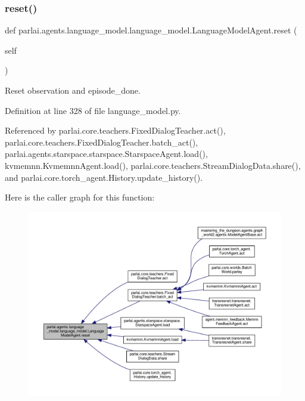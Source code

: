\subsubsection{\texorpdfstring{reset()}{reset()}}
{\footnotesize\ttfamily def parlai.\+agents.\+language\+\_\+model.\+language\+\_\+model.\+Language\+Model\+Agent.\+reset (\begin{DoxyParamCaption}\item[{}]{self }\end{DoxyParamCaption})}

\begin{DoxyVerb}Reset observation and episode_done.\end{DoxyVerb}
 

Definition at line 328 of file language\+\_\+model.\+py.



Referenced by parlai.\+core.\+teachers.\+Fixed\+Dialog\+Teacher.\+act(), parlai.\+core.\+teachers.\+Fixed\+Dialog\+Teacher.\+batch\+\_\+act(), parlai.\+agents.\+starspace.\+starspace.\+Starspace\+Agent.\+load(), kvmemnn.\+Kvmemnn\+Agent.\+load(), parlai.\+core.\+teachers.\+Stream\+Dialog\+Data.\+share(), and parlai.\+core.\+torch\+\_\+agent.\+History.\+update\+\_\+history().

Here is the caller graph for this function\+:
\nopagebreak
\begin{figure}[H]
\begin{center}
\leavevmode
\includegraphics[width=350pt]{classparlai_1_1agents_1_1language__model_1_1language__model_1_1LanguageModelAgent_ae4ccc140cc9d528c4135ec65f2bb4325_icgraph}
\end{center}
\end{figure}
\mbox{\label{classparlai_1_1agents_1_1language__model_1_1language__model_1_1LanguageModelAgent_a62896fd9aa38b55c6ea1b8a8770e3261}} 
